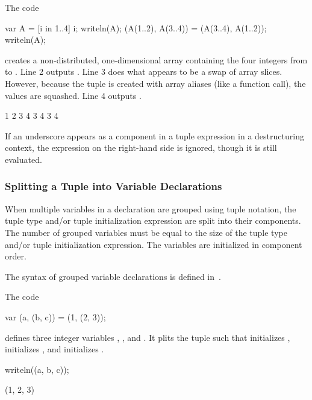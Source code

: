 \begin{example}
\begin{chapelpre}
\end{chapelpre}
The code
\begin{chapel}
var A = [i in 1..4] i;
writeln(A);
(A(1..2), A(3..4)) = (A(3..4), A(1..2));
writeln(A);
\end{chapel}
creates a non-distributed, one-dimensional array containing the four
integers from  to .  Line 2 outputs .
Line 3 does what appears to be a swap of array slices.  However,
because the tuple is created with array aliases (like a function
call), the values are squashed.  Line 4 outputs .
\begin{chapelpost}
\end{chapelpost}
\begin{chapeloutput}
1 2 3 4
3 4 3 4
\end{chapeloutput}
\end{example}

If an underscore appears as a component in a tuple expression in a
destructuring context, the expression on the right-hand side is
ignored, though it is still evaluated.

\subsubsection{Splitting a Tuple into Variable Declarations}
\label{Variable_Declarations_in_a_Tuple}

When multiple variables in a declaration are grouped using tuple
notation, the tuple type and/or tuple initialization expression are
split into their components.  The number of grouped variables must be
equal to the size of the tuple type and/or tuple initialization
expression.  The variables are initialized in component order.

The syntax of grouped variable declarations is defined
in~.

\begin{example}
\begin{chapelpre}
\end{chapelpre}
The code
\begin{chapel}
var (a, (b, c)) = (1, (2, 3));
\end{chapel}
defines three integer variables , , and .  It
plits the tuple  such that 
initializes ,  initializes , and 
initializes .
\begin{chapelpost}
writeln((a, b, c));
\end{chapelpost}
\begin{chapeloutput}
(1, 2, 3)
\end{chapeloutput}
\end{example}

